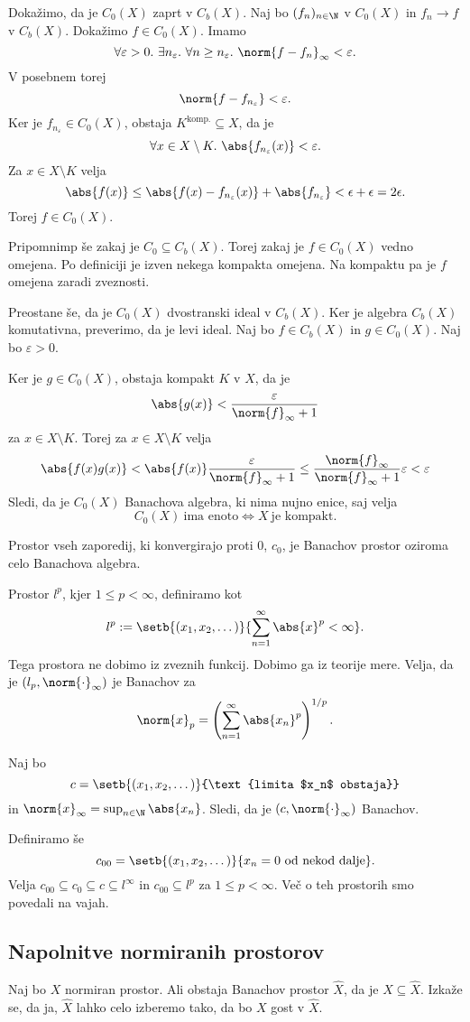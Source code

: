 Dokažimo, da je $C_0(X)$ zaprt v $C_b(X)$.
Naj bo $(f_n)_{n\in \N}$ v $C_0(X)$ in $f_n \to f$ v $C_b(X)$.
Dokažimo $f \in C_0(X)$. Imamo
\[
    \forall \varepsilon > 0.~\exists n_\varepsilon.~\forall 
    n \ge n_\varepsilon.~\norm{f-f_n}_\infty < \varepsilon.
\]
V posebnem torej
\[
    \norm{f - f_{n_\varepsilon}} < \varepsilon.
\]
Ker je $f_{n_\varepsilon} \in C_0(X)$, obstaja $K^{\text{komp.}} \subseteq X$, 
da je 
\[
    \forall x \in X \setminus K.~\abs{f_{n_\varepsilon}(x)} < \varepsilon.
\]
Za $x \in X\setminus K$ velja
\[
    \abs{f(x)} \le \abs{f(x) - f_{n_\varepsilon}(x)} + \abs{f_{n_\varepsilon}} 
    < \epsilon + \epsilon = 2 \epsilon.
\]
Torej $f \in C_0(X)$.

Pripomnimp še zakaj je $C_0 \subseteq C_b(X)$. Torej zakaj je 
$f \in C_0(X)$ vedno omejena. Po definiciji je izven nekega
kompakta omejena. Na kompaktu pa je $f$ omejena zaradi zveznosti.

Preostane še, da je $C_0(X)$ dvostranski ideal v $C_b(X)$.
Ker je algebra $C_b(X)$ komutativna, preverimo, da je levi ideal. 
Naj bo $f \in C_b(X)$ in $g \in C_0(X)$. Naj bo $\varepsilon > 0$.

Ker je $g \in C_0(X)$, obstaja kompakt $K$ v $X$, da je 
\[
    \abs{g(x)} < \frac{\varepsilon}{\norm{f}_\infty + 1}
\]
za $x \in X \setminus K$. Torej za $x \in X \setminus K$ velja
\[
    \abs{f(x)g(x)} <  \abs{f(x)} \frac{\varepsilon}{\norm{f}_\infty + 1} 
    \le \frac{\norm{f}_\infty}{\norm{f}_\infty + 1} \varepsilon < \varepsilon
\]
Sledi, da je $C_0(X)$ Banachova algebra, ki nima nujno enice, saj velja
\[
    C_0(X)~\text{ima enoto} \Leftrightarrow X~\text{je kompakt}.
\]
\begin{primer}
    Prostor vseh zaporedij, ki konvergirajo proti $0$, $c_0$, je 
    Banachov prostor oziroma celo Banachova algebra.
\end{primer}

\begin{opomba}
    Prostor $l^p$, kjer $1 \le p < \infty$, definiramo kot
    \[
        l^p := \setb{(x_1, x_2, \dots)}{ \sum_{n=1}^{\infty} \abs{x}^p < \infty}.
    \] 
    Tega prostora ne dobimo iz zveznih funkcij. Dobimo ga iz 
    teorije mere. Velja, da je 
    $(l_p, \norm{\cdot}_\infty)$ je Banachov za 
    \[
        \norm{x}_p = \left(\sum_{n=1}^{\infty}\abs{x_n}^p\right)^{1/p}.
    \]
\end{opomba}

\begin{primer}
    Naj bo
    \[
        c = \setb{(x_1, x_2, \dots)}{\text{limita $x_n$ obstaja}}
    \]
    in $\norm{x}_\infty = \sup_{n \in \N} \abs{x_n}$. Sledi, da je
    $(c, \norm{\cdot}_\infty)$ Banachov.

    Definiramo še 
    \[
        c_{00} = \setb{(x_1, x_2, \dots)}{x_n = 0~\text{od nekod dalje}}.
    \]
    Velja $c_{00} \subseteq c_0 \subseteq c \subseteq l^\infty$ in 
    $c_{00} \subseteq l^{p}$ za $1 \le p < \infty$. Več o teh 
    prostorih smo povedali na vajah.
\end{primer}

\subsection{Napolnitve normiranih prostorov}

Naj bo $X$ normiran prostor. Ali obstaja Banachov prostor 
$\hat X$, da je $X \subseteq \hat X$. Izkaže se, da ja,  
$\hat X$ lahko celo izberemo tako, da bo $X$ gost v $\hat X$.

